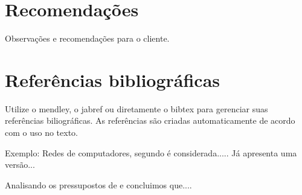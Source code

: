 \documentclass[	DIV=calc,%
paper=a4,%
fontsize=12pt,%
onecolumn]{scrartcl}	 					%
\begin{document}
	\section{Recomendações}
	Observações e recomendações para o cliente.
	
	\section{Referências bibliográficas}
	Utilize o mendley, o jabref ou diretamente o bibtex para gerenciar suas referências biliográficas. As referências são criadas automaticamente de acordo com o uso no texto.
	
	Exemplo: Redes de computadores, segundo \cite{t2013} é considerada..... Já \cite{kurose2010} apresenta uma versão...
	
	Analisando os pressupostos de \cite{ref3} e \cite{ref4} concluimos que....
	
	
	\renewcommand\refname{} %
	
	  
\end{document}
